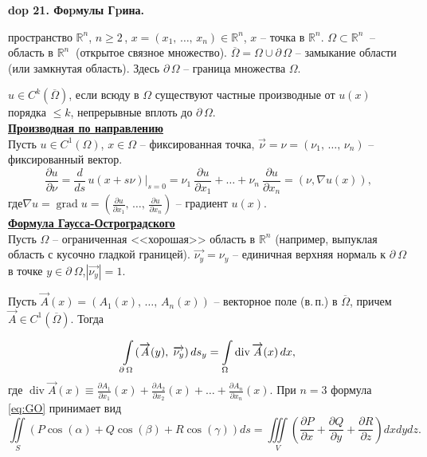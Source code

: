 \textbf{\LARGE dop 21. Фоpмулы Гpина.}
\renewcommand{\theequation}{\arabic{equation}}
\setcounter{equation}{0}

 пространство $\mathbb{R}^n$,  \quad $n \geq 2$\,, \quad $x = (x_1,\,\ldots,\, x_n) \in \mathbb{R}^n$, \quad $x$ -- точка в $\mathbb{R}^n$. 
$\Omega\subset\mathbb{R}^n\:$ -- область в $\mathbb{R}^n\:$ (открытое связное множество). 
$\overline{\Omega} = \Omega \cup \partial\,\Omega$ -- замыкание области (или замкнутая область). Здесь $\partial\,\Omega$ -- граница множества $\Omega$.

 $u \in C^k(\overline{\Omega})$, если всюду в $\Omega$ существуют частные производные от $u(x)$ порядка $\leq k$, непрерывные вплоть до $\partial\,\Omega$.\\
\noindent\underline{\textbf{Производная по направлению}}\\
Пусть $u \in C^1(\Omega)$, \quad $x\in\Omega$ -- фиксированная точка, $\overrightarrow{\nu} = \nu = (\nu_1,\,\ldots,\, \nu_n)$ -- фиксированный вектор.
$$\frac{\partial u}{\partial \nu} = \frac{d}{ds}\,u(x+s\nu)\bigg|_{s=0} =
\nu_1 \: \frac{\partial u}{\partial x_1} + \ldots + \nu_n \: \frac{\partial u}{\partial x_n} = (\nu, \nabla u(x)),$$
где\quad$\nabla u = \displaystyle\operatorname{grad} u = \left(\frac{\partial u}{\partial x_1},\,\ldots,\, \frac{\partial u}{\partial x_n}\right)$ -- градиент $u(x).$ \\

\noindent\underline{\textbf{Формула Гаусса-Остроградского}}\\
Пусть $\Omega$ -- ограниченная <<хорошая>> область в $\mathbb{R}^n$ (например, выпуклая область с кусочно гладкой границей). 
$\overrightarrow{\nu_y} = \nu_y$ -- единичная верхняя нормаль к $\partial\:\Omega$ в точке $y\in\partial\:\Omega$,\quad$\displaystyle |\overrightarrow{\nu_y}| = 1$. 

\noindent Пусть $\overrightarrow{A}(x) = (A_1(x),\, \ldots,\, A_n(x))$ -- векторное поле (в.\,п.) в $\overline{\Omega}$, причем $\overrightarrow{A}\in C^1(\overline{\Omega})$.\;\; Тогда

\renewcommand{\theequation}{\Alph{footnote}\Alph{equation}}
\setcounter{footnote}{7}
\setcounter{equation}{14}
\begin{equation}
\centering
    \int\limits_{\partial\:\Omega} (\overrightarrow{A}(y),\; \overrightarrow{\nu_y})\,ds_y = \int\limits_{\Omega}\operatorname{div}\overrightarrow{A}(x)\,dx, 
    \label{eq:GO}
\end{equation}
\renewcommand{\theequation}{\arabic{equation}}
\setcounter{equation}{0}
где \quad $\displaystyle \operatorname{div}\overrightarrow{A}(x) \equiv \frac{\partial A_1}{\partial x_1}(x)  + \frac{\partial A_2}{\partial x_2}(x) + \ldots + \frac{\partial A_n}{\partial x_n}(x) $. 
\newline\newline
\noindent{} При $n = 3$ формула \eqref{eq:GO} принимает вид
$$
    \iint\limits_S(P\cos(\alpha)+Q\cos(\beta)+R\cos(\gamma))ds = \iiint\limits_V \left(\frac{\partial P}{\partial x} + \frac{\partial Q}{\partial y}+\frac{\partial R}{\partial z}\right)dxdydz. 
$$


